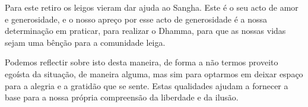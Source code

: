 Para este retiro os leigos vieram dar ajuda ao Sangha. Este é o seu acto de amor
e generosidade, e o nosso apreço por esse acto de generosidade é a nossa
determinação em praticar, para realizar o Dhamma, para que as nossas vidas sejam
uma bênção para a comunidade leiga.

Podemos reflectir sobre isto desta maneira, de forma a não termos proveito
egoísta da situação, de maneira alguma, mas sim para optarmos em deixar espaço
para a alegria e a gratidão que se sente. Estas qualidades ajudam a fornecer a
base para a nossa própria compreensão da liberdade e da ilusão.
